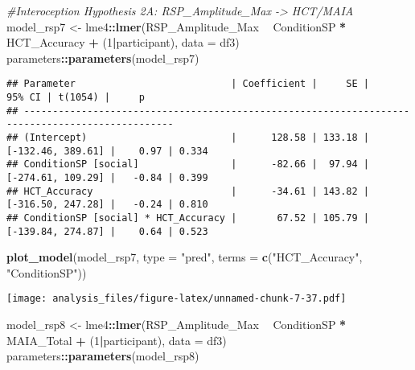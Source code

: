 \documentclass[
]{article}
\newenvironment{Shaded}{\begin{snugshade}}{\end{snugshade}}
\newcommand{\CommentTok}[1]{\textcolor[rgb]{0.56,0.35,0.01}{\textit{#1}}}
\newcommand{\DataTypeTok}[1]{\textcolor[rgb]{0.13,0.29,0.53}{#1}}
\newcommand{\DecValTok}[1]{\textcolor[rgb]{0.00,0.00,0.81}{#1}}
\newcommand{\KeywordTok}[1]{\textcolor[rgb]{0.13,0.29,0.53}{\textbf{#1}}}
\newcommand{\NormalTok}[1]{#1}
\newcommand{\OperatorTok}[1]{\textcolor[rgb]{0.81,0.36,0.00}{\textbf{#1}}}
\newcommand{\StringTok}[1]{\textcolor[rgb]{0.31,0.60,0.02}{#1}}
\begin{document}
\begin{Shaded}
\begin{Highlighting}[]
\CommentTok{#Interoception Hypothesis 2A: RSP_Amplitude_Max -> HCT/MAIA}
\NormalTok{model_rsp7 <-}\StringTok{ }\NormalTok{lme4}\OperatorTok{::}\KeywordTok{lmer}\NormalTok{(RSP_Amplitude_Max }\OperatorTok{~}\StringTok{ }\NormalTok{ConditionSP }\OperatorTok{*}\StringTok{ }\NormalTok{HCT_Accuracy }\OperatorTok{+}\StringTok{ }\NormalTok{(}\DecValTok{1}\OperatorTok{|}\NormalTok{participant), }\DataTypeTok{data =}\NormalTok{ df3)}
\NormalTok{parameters}\OperatorTok{::}\KeywordTok{parameters}\NormalTok{(model_rsp7)}
\end{Highlighting}
\end{Shaded}

\begin{verbatim}
## Parameter                           | Coefficient |     SE |            95% CI | t(1054) |     p
## ------------------------------------------------------------------------------------------------
## (Intercept)                         |      128.58 | 133.18 | [-132.46, 389.61] |    0.97 | 0.334
## ConditionSP [social]                |      -82.66 |  97.94 | [-274.61, 109.29] |   -0.84 | 0.399
## HCT_Accuracy                        |      -34.61 | 143.82 | [-316.50, 247.28] |   -0.24 | 0.810
## ConditionSP [social] * HCT_Accuracy |       67.52 | 105.79 | [-139.84, 274.87] |    0.64 | 0.523
\end{verbatim}

\begin{Shaded}
\begin{Highlighting}[]
\KeywordTok{plot_model}\NormalTok{(model_rsp7, }\DataTypeTok{type =} \StringTok{"pred"}\NormalTok{, }\DataTypeTok{terms =} \KeywordTok{c}\NormalTok{(}\StringTok{"HCT_Accuracy"}\NormalTok{, }\StringTok{"ConditionSP"}\NormalTok{))}
\end{Highlighting}
\end{Shaded}

\texttt{[image: analysis\_files/figure-latex/unnamed-chunk-7-37.pdf]}

\begin{Shaded}
\begin{Highlighting}[]
\NormalTok{model_rsp8 <-}\StringTok{ }\NormalTok{lme4}\OperatorTok{::}\KeywordTok{lmer}\NormalTok{(RSP_Amplitude_Max }\OperatorTok{~}\StringTok{ }\NormalTok{ConditionSP }\OperatorTok{*}\StringTok{ }\NormalTok{MAIA_Total }\OperatorTok{+}\StringTok{ }\NormalTok{(}\DecValTok{1}\OperatorTok{|}\NormalTok{participant), }\DataTypeTok{data =}\NormalTok{ df3)}
\NormalTok{parameters}\OperatorTok{::}\KeywordTok{parameters}\NormalTok{(model_rsp8)}
\end{Highlighting}
\end{Shaded}
\end{document}
